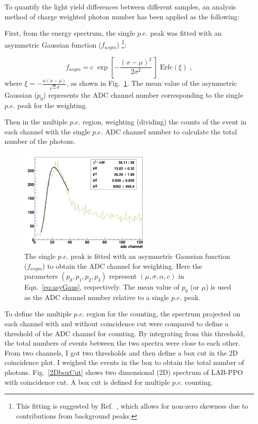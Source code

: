 To quantify the light yield differences between different samples, an analysis method of charge weighted photon number has been applied as the following:

First, from the energy spectrum, the single $p.e.$ peak was fitted with an asymmetric Gaussian function ($f_{asym}$) \footnote{This fitting is suggested by Ref.~\cite{von2016measurement}, which allows for non-zero skewness due to contributions from background peaks.}:

\begin{equation}\label{eq:asyGaus}
f_{asym}=c \; \exp\left[- \frac{(x-\mu)^2}{2 \sigma^2} \, \right] \; \mathrm{Erfc}(\xi)\; ,
\end{equation}
where $\xi=-\frac{\alpha(x-\mu)}{\sqrt 2\sigma}$,
as shown in Fig.~\ref{fitSinglePE}. The mean value of the asymmetric Gaussian ($p_0$) represents the ADC channel number corresponding to the single $p.e.$ peak for the weighting. 

Then in the multiple $p.e.$ region, weighting (dividing) the counts of the event in each channel with the single $p.e.$ ADC channel number to calculate the total number of the photons.

\begin{figure}[htbp]
	\centering	
	\includegraphics[width=6.5cm]{fitSinglePE.png}
	\caption[The single $p.e.$ peak fitted with an asymmetric Gaussian function.]{The single $p.e.$ peak is fitted with an asymmetric Gaussian function ($f_{asym}$) to obtain the ADC channel for weighting. Here the parameters $(p_0,p_1,p_2,p_3)$ represent $(\mu, \sigma, \alpha, c)$ in Eqn.~\ref{eq:asyGaus}, respectively. The mean value of $p_0$ (or $\mu$) is used as the ADC channel number relative to a single $p.e.$ peak.}
	\label{fitSinglePE}
\end{figure}

To define the multiple $p.e.$ region for the counting, the spectrum projected on each channel with and without coincidence cut were compared to define a threshold of the ADC channel for counting. By integrating from this threshold, the total numbers of events between the two spectra were close to each other. From two channels, I got two thresholds and then define a box cut in the 2D coincidence plot. I weighed the events in the box to obtain the total number of photons. Fig.~\ref{2DboxCut} shows two dimensional (2D) spectrum of LAB-PPO with coincidence cut. A box cut is defined for multiple $p.e.$ counting. 

